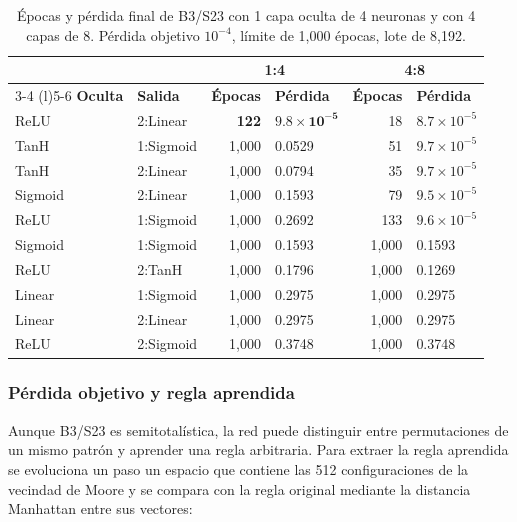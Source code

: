 \begin{table}[!tp]
	\centering
	\footnotesize
	\setlength{\tabcolsep}{3.5pt}
	\begin{tabular}{@{}llrlrl@{}}
		\toprule
		& & \multicolumn{2}{c}{\textbf{1:4}} & \multicolumn{2}{c}{\textbf{4:8}} \\
		\cmidrule(lr){3-4} \cmidrule(l){5-6}
		\textbf{Oculta} & \textbf{Salida} & \textbf{Épocas} & \textbf{Pérdida} & \textbf{Épocas} & \textbf{Pérdida} \\
		\midrule
		ReLU & 2:Linear & \textbf{122} & $\mathbf{9.8\times10^{-5}}$ & 18 & $8.7\times10^{-5}$ \\
		TanH & 1:Sigmoid & 1,000 & 0.0529 & 51 & $9.7\times10^{-5}$ \\
		TanH & 2:Linear & 1,000 & 0.0794 & 35 & $9.7\times10^{-5}$ \\
		Sigmoid & 2:Linear & 1,000 & 0.1593 & 79 & $9.5\times10^{-5}$ \\
		ReLU & 1:Sigmoid & 1,000 & 0.2692 & 133 & $9.6\times10^{-5}$ \\
		Sigmoid & 1:Sigmoid & 1,000 & 0.1593 & 1,000 & 0.1593 \\
		ReLU & 2:TanH & 1,000 & 0.1796 & 1,000 & 0.1269 \\
		Linear & 1:Sigmoid & 1,000 & 0.2975 & 1,000 & 0.2975 \\
		Linear & 2:Linear & 1,000 & 0.2975 & 1,000 & 0.2975 \\
		ReLU & 2:Sigmoid & 1,000 & 0.3748 & 1,000 & 0.3748 \\
		\bottomrule
	\end{tabular}
	\caption{Épocas y pérdida final de B3/S23 con 1 capa oculta de 4 neuronas y con 4 capas de 8. Pérdida objetivo $10^{-4}$, límite de 1,000 épocas, lote de 8,192.}
	\label{tab:gol_activaciones}
\end{table}

\subsubsection{Pérdida objetivo y regla aprendida}
Aunque B3/S23 es semitotalística, la red puede distinguir entre permutaciones de un mismo patrón y aprender una regla arbitraria. Para extraer la regla aprendida se evoluciona un paso un espacio que contiene las 512 configuraciones de la vecindad de Moore y se compara con la regla original mediante la distancia Manhattan entre sus vectores:

